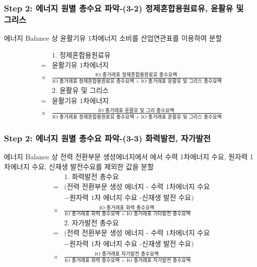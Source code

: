 \documentclass[10pt,compress,slidetop,%
			   hyperref={unicode},xcolor={svgnames},%
			   t]{beamer}
\begin{document}
\begin{frame}
	\frametitle{Step 2: 에너지 원별 총수요 파악-(3-2) 정제혼합용원료유, 윤활유 및 그리스 }

에너지 Balance 상 윤활기유 1차에너지 소비를 산업연관표를 이용하여 분할 
\begin{footnotesize}
\begin{eqnarray*}
			& &\mbox{1. 정제혼합용원료유}\\ 
			&=&\mbox{윤활기유 1차에너지}\\
			&\times&\frac{\mbox{IO 총거래표 정제혼합용원료유 총수요액 }}{\mbox{IO 총거래표 정제혼합용원료유 총수요액 + IO 총거래표 윤활유 및 그리스 총수요액}} 
			\end{eqnarray*}
			\begin{eqnarray*}
			& &\mbox{2. 윤활유 및 그리스 }\\ 
			&=&\mbox{윤활기유 1차에너지}\\
			&\times&\frac{\mbox{IO 총거래표 윤활유 및 그리 총수요액 }}{\mbox{IO 총거래표 정제혼합용원료유 총수요액 + IO 총거래표 윤활유 및 그리스 총수요액}} 
			\end{eqnarray*}
\end{footnotesize}	
\end{frame}


\begin{frame}
	\frametitle{Step 2: 에너지 원별 총수요 파악-(3-3) 화력발전, 자가발전}

에너지 Balance 상 전력 전환부문 생성에너지에서 에서 수력 1차에너지 수요, 원자력 1차에너지 수요, 신재생 발전수요를 제외한 값을 분할 
\begin{eqnarray*}
			& &\mbox{1. 화력발전 총수요}\\ 
			&=&(\mbox{전력 전환부문 생성 에너지 - 수력 1차에너지 수요}\\
			& &-\mbox{원자력 1차 에너지 수요 -신재생 발전 수요})\\
			&\times&\frac{\mbox{IO 총거래표 화력 총수요액 }}{\mbox{IO 총거래표 화력 총수요액 + IO 총거래표 기타발전 총수요액}} 
			\end{eqnarray*}
			\begin{eqnarray*}
			& &\mbox{2. 자가발전 총수요}\\ 
			&=&(\mbox{전력 전환부문 생성 에너지 - 수력 1차에너지 수요}\\
			& &-\mbox{원자력 1차 에너지 수요 -신재생 발전 수요})\\
			&\times&\frac{\mbox{IO 총거래표 자가발전 총수요액 }}{\mbox{IO 총거래표 화력 총수요액 + IO 총거래표 자가발전 총수요액}} 
			\end{eqnarray*}
	
\end{frame}
\end{document}
